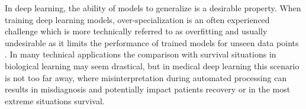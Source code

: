     In deep learning, the ability of models to generalize is a desirable property.  When training deep learning models, over-specialization is an often experienced challenge which is more technically referred to as overfitting and usually undesirable as it limits the performance of trained models for unseen data points \citep{xx}.
    In many technical applications the comparison with survival situations in biological learning may seem drastical, but in medical deep learning this scenario is not too far away, where misinterpretation during automated processing can results in misdiagnosis and potentially impact patients recovery or in the most extreme situations survival.





















